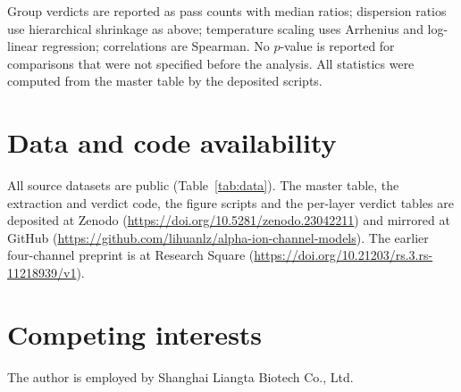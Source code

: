 \documentclass[11pt,a4paper]{article}
\begin{document}
Group verdicts are reported as pass counts with median ratios; dispersion ratios
use hierarchical shrinkage as above; temperature scaling uses Arrhenius and
log-linear regression; correlations are Spearman. No $p$-value is reported for
comparisons that were not specified before the analysis. All statistics were
computed from the master table by the deposited scripts.

\section*{Data and code availability}

\begin{sloppypar}
All source datasets are public (Table~\ref{tab:data}). The master table, the
extraction and verdict code, the figure scripts and the per-layer verdict tables
are deposited at Zenodo (\url{https://doi.org/10.5281/zenodo.23042211}) and
mirrored at GitHub
(\url{https://github.com/lihuanlz/alpha-ion-channel-models}). The earlier
four-channel preprint is at Research Square
(\url{https://doi.org/10.21203/rs.3.rs-11218939/v1}).
\end{sloppypar}

\section*{Competing interests}

The author is employed by Shanghai Liangta Biotech Co., Ltd.
\end{document}
